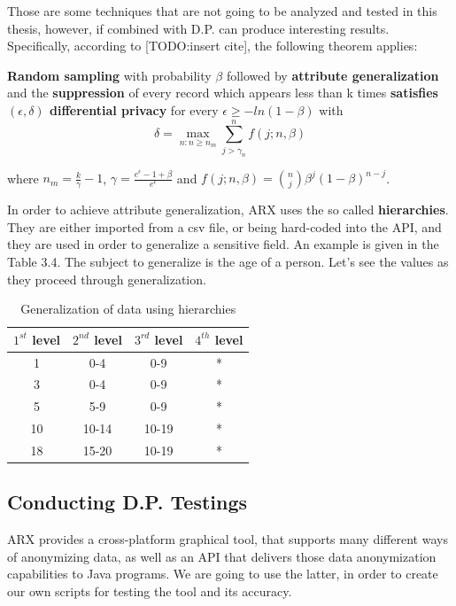 Those are some techniques that are not going to be analyzed and tested in this thesis, however, if combined with D.P. can produce interesting results. Specifically, according to [TODO:insert cite], the following theorem applies:

\textbf{Random sampling} with probability $\beta$ followed by \textbf{attribute generalization} and the \textbf{suppression} of
every record which appears less than k times \textbf{satisfies $(\epsilon, \delta)$ differential privacy} for every $\epsilon \geq -ln(1-\beta)$ with 
$$\delta = \max_{n:n \geq n_m} \sum_{j>\gamma_n}^{n}f(j;n,\beta)$$

where $n_m = \frac{k}{\gamma} - 1$, $\gamma = \frac{e^\epsilon-1+\beta}{e^\epsilon}$ and $f(j;n,\beta) = {n \choose  j} \beta^j(1-\beta)^{n-j}$.

In order to achieve attribute generalization, ARX uses the so called \textbf{hierarchies}. They are either imported from a csv file, or being hard-coded into the API, and they are used in order to generalize a sensitive field. An example is given in the Table 3.4. The subject to generalize is the age of a person. Let's see the values as they proceed through generalization.

\begin{table}[!htb]
    \centering

    \caption{Generalization of data using hierarchies}
    \label{numbers}

    \begin{tabular}{| c | c | c | c |}
      \hline 
      $1^{st}$ level & $2^{nd}$ level & $3^{rd}$ level & $4^{th}$ level\\
      \hline
      1 & 0-4 & 0-9 & *\\
      \hline
      3 & 0-4 & 0-9 & *\\
      \hline
      5 & 5-9 & 0-9 & * \\
      \hline
      10 & 10-14 & 10-19 & *\\
      \hline
      18 & 15-20 & 10-19 & *\\
      \hline
    
    \end{tabular}
\end{table}

\subsection{Conducting D.P. Testings}

ARX provides a cross-platform graphical tool, that supports many different ways of anonymizing data, as well as an API that delivers those data anonymization capabilities to Java programs. We are going to use the latter, in order to create our own scripts for testing the tool and its accuracy.

